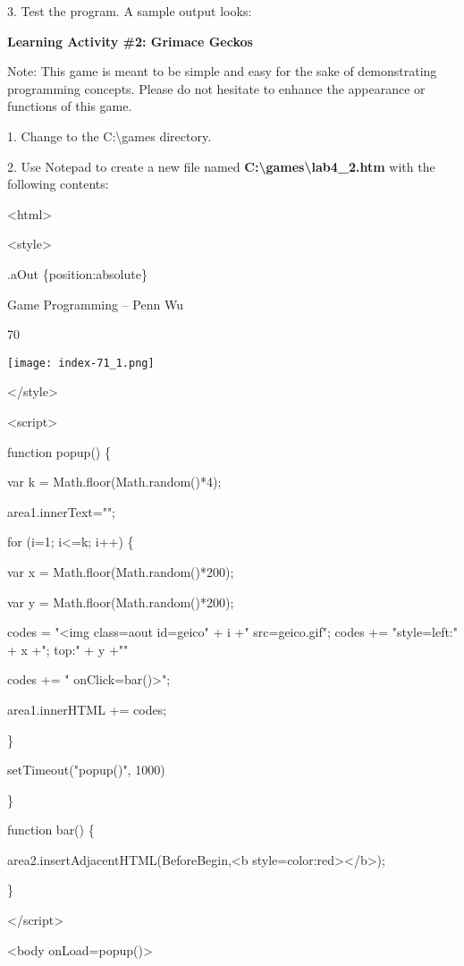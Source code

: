 \documentclass[
]{article}
\begin{document}
3. Test the program. A sample output looks:

\textbf{Learning Activity \#2: Grimace Geckos}

Note: This game is meant to be simple and easy for the sake of
demonstrating programming concepts. Please do not hesitate to enhance
the appearance or functions of this game.

1. Change to the C:\textbackslash games directory.

2. Use Notepad to create a new file named
\textbf{C:\textbackslash games\textbackslash lab4\_2.htm} with the
following contents:

\textless html\textgreater{}

\textless style\textgreater{}

.aOut \{position:absolute\}

Game Programming -- Penn Wu

70

\protect\hypertarget{index_split_005.htmlux5cux23p71}{}{}\texttt{[image: index-71\_1.png]}

\textless/style\textgreater{}

\textless script\textgreater{}

function popup() \{

var k = Math.floor(Math.random()*4);

area1.innerText="";

for (i=1; i\textless=k; i++) \{

var x = Math.floor(Math.random()*200);

var y = Math.floor(Math.random()*200);

codes = "\textless img class=aout id=geico" + i +"
src=\textquotesingle geico.gif\textquotesingle"; codes +=
"style=\textquotesingle left:" + x +"; top:" + y +"\textquotesingle"

codes += " onClick=bar()\textgreater";

area1.innerHTML += codes;

\}

setTimeout("popup()", 1000)

\}

function bar() \{

area2.insertAdjacentHTML(\textquotesingle BeforeBegin\textquotesingle,\textquotesingle\textless b
style=color:red\textgreater\textbar\textless/b\textgreater\textquotesingle);

\}

\textless/script\textgreater{}

\textless body onLoad=popup()\textgreater{}
\end{document}
